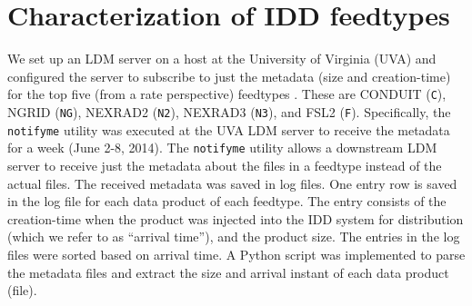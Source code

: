 \section{Characterization of IDD feedtypes}
\label{sec:characterization}


We set up an LDM server on a host at the University
of Virginia (UVA) and configured the server to subscribe to just the
metadata (size and creation-time) for
the top five (from a  rate perspective) feedtypes \cite{IDD_Realtime}.
These are CONDUIT (\texttt{C}), NGRID (\texttt{NG}), NEXRAD2 (\texttt{N2}), NEXRAD3 (\texttt{N3}), and FSL2 (\texttt{F}).
Specifically, the \texttt{notifyme} utility was executed at the UVA LDM server
to receive the metadata for a week (June 2-8, 2014).
The \texttt{notifyme} utility allows a downstream LDM server to receive just the metadata about the files in a feedtype instead of the actual files.
The received metadata
was saved in log files. One entry row is saved in the log file
for each data product of each feedtype. The entry consists of the
creation-time when the product was injected into the IDD system for
distribution (which we refer to as ``arrival time''), and the product size.
The entries in the log files were sorted based on arrival time.
A Python script was implemented
to parse the metadata files and extract the size and arrival
instant of each data product (file).

